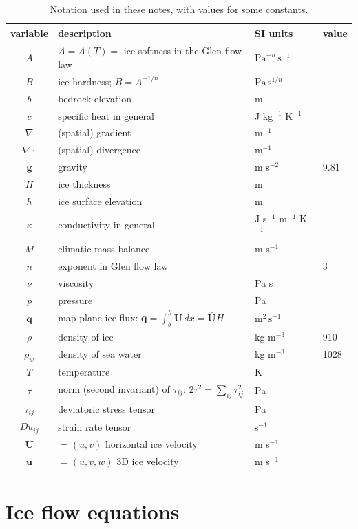 \documentclass[letterpaper,final,12pt,reqno]{amsart}
\newcommand{\bq}{\mathbf{q}}
\newcommand{\bU}{\mathbf{U}}
\begin{document}
\begin{table}[ht]
\caption{Notation used in these notes, with values for some constants.}
\begin{tabular}{clll}
variable  & description & SI units & value \\
\hline
$A$ & $A=A(T)=$ ice softness in the Glen flow law & $\text{Pa}^{-n}\,\text{s}^{-1}$ \\
$B$ & ice hardness; $B=A^{-1/n}$ & $\text{Pa}\,\text{s}^{1/n}$ \\
$b$ & bedrock elevation & m \\
$c$ & specific heat in general & J kg$^{-1}$ K$^{-1}$ \\
$\nabla$ & (spatial) gradient & m$^{-1}$ \\
$\nabla\cdot$ & (spatial) divergence & m$^{-1}$ \\
$\mathbf{g}$ & gravity & m s$^{-2}$\phantom{foobar} & 9.81 \\
$H$ & ice thickness & m \\
$h$ & ice surface elevation & m \\
$\kappa$ & conductivity in general & J s$^{-1}$ m$^{-1}$ K$^{-1}$ \\
$M$ & climatic mass balance & m s$^{-1}$ \\
$n$ & exponent in Glen flow law & & 3 \\
$\nu$ & viscosity & Pa s \\
$p$ & pressure & Pa \\
$\bq$ & map-plane ice flux: $\bq = \int_{b}^{h} \bU\,dx = \bar{\bU} H$ & $\text{m}^2\,\text{s}^{-1}$ \\
$\rho$ & density of ice & kg m$^{-3}$ & 910 \\
$\rho_w$ & density of sea water & kg m$^{-3}$ & 1028 \\
$T$ & temperature & K \\
$\tau$ & norm (second invariant) of $\tau_{ij}$: $2 \tau^2 = \sum_{ij} \tau_{ij}^2$ & Pa \\
$\tau_{ij}$ & deviatoric stress tensor & Pa \\
$Du_{ij}$ & strain rate tensor & s$^{-1}$ \\
$\mathbf{U}$ & $=(u,v)$ horizontal ice velocity & m s$^{-1}$ \\
$\mathbf{u}$ & $=(u,v,w)$ 3D ice velocity & m s$^{-1}$ \\
\end{tabular}
\label{tab:notation}
\end{table}


\section{Ice flow equations}  \label{sec:continuum}
\end{document}
